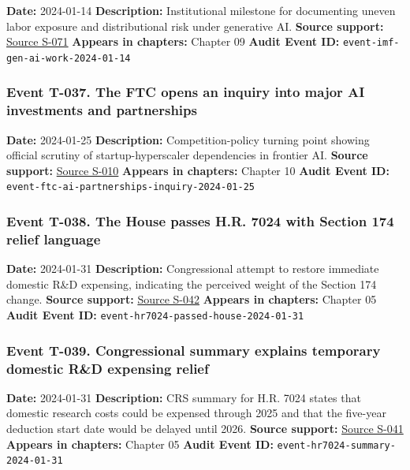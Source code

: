 \documentclass[
  american,
  11pt,
  letterpaper,
]{article}
\begin{document}
\textbf{Date:} 2024-01-14 \textbf{Description:} Institutional milestone
for documenting uneven labor exposure and distributional risk under
generative AI. \textbf{Source support:}
\hyperref[source-s-071-gen-ai-artificial-intelligence-and-the-future-of-work]{Source
S-071} \textbf{Appears in chapters:} Chapter 09 \textbf{Audit Event ID:}
\texttt{event-imf-gen-ai-work-2024-01-14}

\subsubsection{Event T-037. The FTC opens an inquiry into major AI
investments and
partnerships}\label{event-t-037-the-ftc-opens-an-inquiry-into-major-ai-investments-and-partnerships}

\textbf{Date:} 2024-01-25 \textbf{Description:} Competition-policy
turning point showing official scrutiny of startup-hyperscaler
dependencies in frontier AI. \textbf{Source support:}
\hyperref[source-s-010-ftc-opens-inquiry-into-big-tech-s-partnerships-with-leading-ai-startups]{Source
S-010} \textbf{Appears in chapters:} Chapter 10 \textbf{Audit Event ID:}
\texttt{event-ftc-ai-partnerships-inquiry-2024-01-25}

\subsubsection{Event T-038. The House passes H.R. 7024 with Section 174
relief
language}\label{event-t-038-the-house-passes-h-r-7024-with-section-174-relief-language}

\textbf{Date:} 2024-01-31 \textbf{Description:} Congressional attempt to
restore immediate domestic R\&D expensing, indicating the perceived
weight of the Section 174 change. \textbf{Source support:}
\hyperref[source-s-042-h-r-7024-tax-relief-for-american-families-and-workers-act-of-2024]{Source
S-042} \textbf{Appears in chapters:} Chapter 05 \textbf{Audit Event ID:}
\texttt{event-hr7024-passed-house-2024-01-31}

\subsubsection{Event T-039. Congressional summary explains temporary
domestic R\&D expensing
relief}\label{event-t-039-congressional-summary-explains-temporary-domestic-r-d-expensing-relief}

\textbf{Date:} 2024-01-31 \textbf{Description:} CRS summary for H.R.
7024 states that domestic research costs could be expensed through 2025
and that the five-year deduction start date would be delayed until 2026.
\textbf{Source support:}
\hyperref[source-s-041-h-r-7024-tax-relief-for-american-families-and-workers-act-of-2024-crs-summary]{Source
S-041} \textbf{Appears in chapters:} Chapter 05 \textbf{Audit Event ID:}
\texttt{event-hr7024-summary-2024-01-31}
\end{document}
